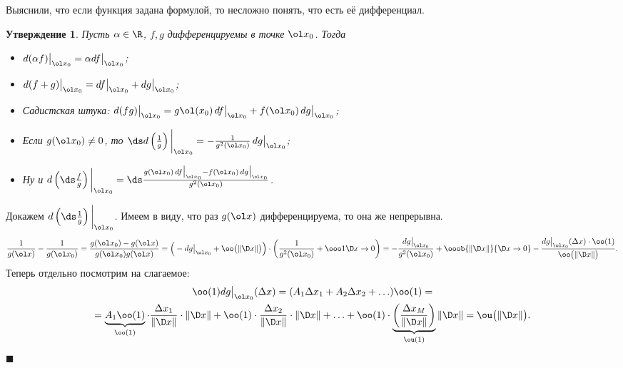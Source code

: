 \documentclass[a4paper,10pt,twoside]{article}
\newtheorem{Ut}{Утверждение}[section]
\newenvironment{Proof}
       {\par\noindent{\textbf{Доказательство.}}}
       {\hfill$\scriptstyle\blacksquare$}
\begin{document}
	 Выяснили, что если функция задана формулой, то несложно понять, что есть её дифференциал.
	 
	 \begin{Ut}
	 Пусть $\alpha \in\R$, $f,g$ дифференцируемы в точке $\ol x_0$. Тогда 
	 \begin{itemize}
	   \item $d(\alpha f)\big|_{\ol x_0} = \alpha df\big|_{\ol x_0}$;
	   \item $d(f+g)\big|_{\ol x_0} = df\big|_{\ol x_0} + dg\big|_{\ol x_0}$;
	   \item Садистская штука: $d(fg)\big|_{\ol x_0} = g\ol (x_0)\,df\big|_{\ol x_0} + f(\ol x_0)\,dg\big|_{\ol x_0}$;
	   \item Если $g(\ol x_0)\neq 0$, то $\ds d\left(\frac{1}{g}\right)\bigg|_{\ol x_0} = -\frac{1}{g^2(\ol x_0)}\,dg\big|_{\ol x_0}$;
	   \item Ну и $d\left(\ds\frac{f}{g}\right)\bigg|_{\ol x_0} = \ds\frac{g(\ol x_0)\,df\big|_{\ol x_0} - f(\ol x_0)\,dg\big|_{\ol x_0}}{g^2(\ol x_0)}$.
	 \end{itemize}
	 \end{Ut}
	 \begin{Proof}
	 Докажем $d\left(\ds\frac1g\right)\bigg|_{\ol x_0}$. Имеем в виду, что раз $g(\ol x)$ дифференцируема, то она же непрерывна.
	 \[\frac1{g(\ol x)} - \frac1{g(\ol x_0)} = \frac{g(\ol x_0) - g(\ol x)}{g(\ol x_0)g(\ol x)} = \Big(-dg\big|_{\ol x_0} +
	  \oo\big(\|\D x\|\big)\Big)\cdot \bigg(\frac1{g^2(\ol x_0)} + \ooo1{\D x\to 0}\bigg)= - \frac{dg\big|_{\ol x_0}}{g^2(\ol x_0)}
	   + \ooob{\|\D x\|}{\D x\to 0} - \frac{dg\big|_{\ol x_0}(\Delta x)\cdot \oo(1)}{\oo\big(\|\D x\|\big)}.\]
	   Теперь отдельно посмотрим на слагаемое:
	   \begin{multline*}\oo(1)dg\big|_{\ol x_0}(\Delta x) = (A_1\Delta x_1 + A_2\Delta x_2+\ldots)\oo(1) = \\ =\underbrace{A_1\oo(1)}_{\oo(1)}\cdot \frac{\Delta x_1}{\|\D x\|}\cdot \|\D x\| +
	   \oo(1)\cdot \frac{\Delta x_2}{\| \D x\|}\cdot \|\D x\| + \ldots + \oo(1)\cdot\underbrace{\left(\frac{\Delta x_M}{\|\D x\|}\right)}_{\ou(1)}\|\D x\| = \ou\big(\|\D x\|\big).\end{multline*}
	 \end{Proof}
\end{document}
